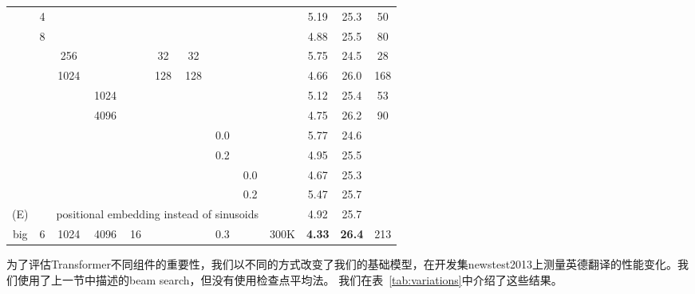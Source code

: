 \begin{table}[t]
\begin{center}
\begin{tabular}{c|ccccccccc|ccc}
& 4 & & & & & & & &            & 5.19 & 25.3 & 50 \\
& 8 & & & & & & & &            & 4.88 & 25.5 & 80 \\
& & 256 & & & 32 & 32 & & &    & 5.75 & 24.5 & 28 \\
& & 1024 & & & 128 & 128 & & & & 4.66 & 26.0 & 168 \\
& & & 1024 & & & & & &         & 5.12 & 25.4 & 53 \\
& & & 4096 & & & & & &         & 4.75 & 26.2 & 90 \\
\hline\rule{0pt}{2.0ex}
\multirow{4}{*}{(D)}
& & & & & & & 0.0 & & & 5.77 & 24.6 &  \\
& & & & & & & 0.2 & & & 4.95 & 25.5 &  \\
& & & & & & & & 0.0 & & 4.67 & 25.3 &  \\
& & & & & & & & 0.2 & & 5.47 & 25.7 &  \\
\hline\rule{0pt}{2.0ex}
(E) & & \multicolumn{7}{c}{positional embedding instead of sinusoids} & & 4.92 & 25.7 & \\
\hline\rule{0pt}{2.0ex}
big & 6 & 1024 & 4096 & 16 & & & 0.3 & & 300K & \textbf{4.33} & \textbf{26.4} & 213 \\
\hline
\end{tabular}
\end{center}
\end{table}




为了评估Transformer不同组件的重要性，我们以不同的方式改变了我们的基础模型，在开发集newstest2013上测量英德翻译的性能变化。我们使用了上一节中描述的beam search，但没有使用检查点平均法。 我们在表~\ref{tab:variations}中介绍了这些结果。

